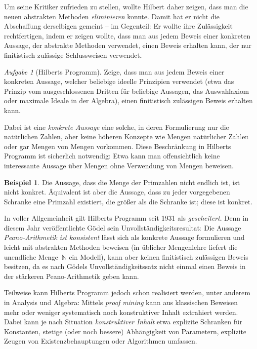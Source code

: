 \documentclass[a4paper,ngerman,12pt]{scrartcl}
\theoremstyle{definition}
\newtheorem{bsp}[defn]{Beispiel}
\theoremstyle{plain}
\theoremstyle{remark}
\newtheorem{aufg}[defn]{Aufgabe}
\newcommand{\NN}{\mathbb{N}}
\renewcommand{\_}{\mathpunct{.}\,}
\newcommand{\?}{\,{:}\,}
\begin{document}
Um seine Kritiker zufrieden zu stellen, wollte Hilbert daher zeigen, dass man
die neuen abstrakten Methoden \emph{eliminieren} konnte. Damit hat er nicht die
Abschaffung derselbigen gemeint -- im Gegenteil: Er wollte ihre Zulässigkeit
rechtfertigen, indem er zeigen wollte, dass man aus jedem Beweis einer
konkreten Aussage, der abstrakte Methoden verwendet, einen Beweis erhalten
kann, der nur finitistisch zulässige Schlussweisen verwendet.

\begin{aufg}[Hilberts Programm]Zeige, dass man aus jedem Beweis einer konkreten
Aussage, welcher beliebige ideelle Prinzipien verwendet (etwa das Prinzip vom ausgeschlossenen
Dritten für beliebige Aussagen, das Auswahlaxiom oder maximale Ideale in der Algebra),
einen finitistisch zulässigen Beweis erhalten kann.\end{aufg}

Dabei ist eine \emph{konkrete Aussage} eine solche, in deren Formulierung nur
die natürlichen Zahlen, aber keine höheren Konzepte wie Mengen natürlicher
Zahlen oder gar Mengen von Mengen vorkommen. Diese Beschränkung in Hilberts
Programm ist sicherlich notwendig: Etwa kann man offensichtlich keine interessante Aussage
über Mengen ohne Verwendung von Mengen beweisen.

\begin{bsp}Die Aussage, dass die Menge der Primzahlen nicht endlich ist, ist
nicht konkret. Äquivalent ist aber die Aussage, dass zu jeder vorgegebenen
Schranke eine Primzahl existiert, die größer als die Schranke ist; diese
ist konkret.\end{bsp}

In voller Allgemeinheit gilt Hilberts Programm seit 1931 als
\emph{gescheitert}. Denn in diesem Jahr veröffentlichte Gödel sein
Unvollständigkeitsresultat: Die Aussage \emph{Peano-Arithmetik ist konsistent}
lässt sich als konkrete Aussage formulieren und leicht mit abstrakten
Methoden beweisen (in üblicher Mengenlehre liefert die unendliche Menge~$\NN$
ein Modell), kann aber keinen finitistisch zulässigen Beweis besitzen, da es
nach Gödels Unvollständigkeitssatz nicht einmal einen Beweis in der stärkeren
Peano-Arithmetik geben kann.

Teilweise kann Hilberts Programm jedoch schon realisiert werden, unter anderem
in Analysis und Algebra: Mittels \emph{proof mining} kann aus klassischen
Beweisen mehr oder weniger systematisch noch konstruktiver Inhalt extrahiert
werden. Dabei kann je nach Situation \emph{konstruktiver Inhalt} etwa
explizite Schranken für Konstanten, stetige (oder noch bessere) Abhängigkeit
von Parametern, explizite Zeugen von Existenzbehauptungen oder Algorithmen
umfassen.
\end{document}
